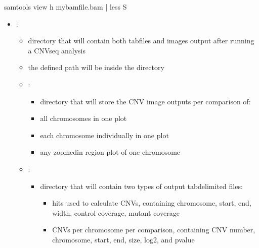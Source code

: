 \documentclass[letterpaper,10pt,english]{sphinxhowto}
\begin{document}
\begin{sphinxVerbatim}[commandchars=\\\{\}]
\PYGZdl{} samtools view \PYGZhy{}h my\PYGZus{}bam\PYGZus{}file.bam | less \PYGZhy{}S
\end{sphinxVerbatim}
\begin{itemize}
\item {} 
\sphinxAtStartPar
{}:
\begin{itemize}
\item {} 
\sphinxAtStartPar
directory that will contain both tab\sphinxhyphen{}files and images output after running a CNVseq analysis

\item {} 
\sphinxAtStartPar
the defined path will be inside the  directory

\item {} 
\sphinxAtStartPar
{}:
\begin{itemize}
\item {} 
\sphinxAtStartPar
directory that will store the CNV image outputs per comparison of:

\item {} 
\sphinxAtStartPar
all chromosomes in one plot

\item {} 
\sphinxAtStartPar
each chromosome individually in one plot

\item {} 
\sphinxAtStartPar
any zoomed\sphinxhyphen{}in region plot of one chromosome

\end{itemize}

\item {} 
\sphinxAtStartPar
{}:
\begin{itemize}
\item {} 
\sphinxAtStartPar
directory that will contain two types of output tab\sphinxhyphen{}delimited files:
\begin{itemize}
\item {} 
\sphinxAtStartPar
hits used to calculate CNVs, containing chromosome, start, end, width, control coverage, mutant coverage

\item {} 
\sphinxAtStartPar
CNVs per chromosome per comparison, containing CNV number, chromosome, start, end, size, log2, and p\sphinxhyphen{}value


\end{itemize}
\end{itemize}
\end{itemize}
\end{itemize}
\end{document}
